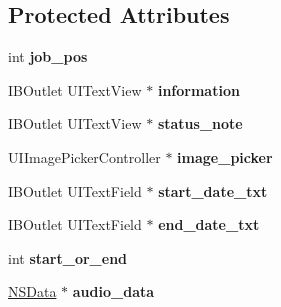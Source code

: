 \subsection*{\-Protected \-Attributes}
\begin{DoxyCompactItemize}
\item 
\hypertarget{interface_check_out_entry_aeee2de59ad12dcf4e823726ac5afe302}{
int {\bfseries job\-\_\-pos}}
\label{interface_check_out_entry_aeee2de59ad12dcf4e823726ac5afe302}

\item 
\hypertarget{interface_check_out_entry_aea12e8d2a44a930ae75b22875d503d58}{
\-I\-B\-Outlet \-U\-I\-Text\-View $\ast$ {\bfseries information}}
\label{interface_check_out_entry_aea12e8d2a44a930ae75b22875d503d58}

\item 
\hypertarget{interface_check_out_entry_af48347effc2517db69384aef1ffc4990}{
\-I\-B\-Outlet \-U\-I\-Text\-View $\ast$ {\bfseries status\-\_\-note}}
\label{interface_check_out_entry_af48347effc2517db69384aef1ffc4990}

\item 
\hypertarget{interface_check_out_entry_a738127b16e6dc738c69292398dcac04c}{
\-U\-I\-Image\-Picker\-Controller $\ast$ {\bfseries image\-\_\-picker}}
\label{interface_check_out_entry_a738127b16e6dc738c69292398dcac04c}

\item 
\hypertarget{interface_check_out_entry_a488bc135c242b5537eb14d663551dd18}{
\-I\-B\-Outlet \-U\-I\-Text\-Field $\ast$ {\bfseries start\-\_\-date\-\_\-txt}}
\label{interface_check_out_entry_a488bc135c242b5537eb14d663551dd18}

\item 
\hypertarget{interface_check_out_entry_a2e2985b3edfb171c429590858872aad5}{
\-I\-B\-Outlet \-U\-I\-Text\-Field $\ast$ {\bfseries end\-\_\-date\-\_\-txt}}
\label{interface_check_out_entry_a2e2985b3edfb171c429590858872aad5}

\item 
\hypertarget{interface_check_out_entry_a6f8e5085839439744bfb8f693cb14104}{
int {\bfseries start\-\_\-or\-\_\-end}}
\label{interface_check_out_entry_a6f8e5085839439744bfb8f693cb14104}

\item 
\hypertarget{interface_check_out_entry_a4271dc6fb86593a18129f60fe3de0fda}{
\hyperlink{class_n_s_data}{\-N\-S\-Data} $\ast$ {\bfseries audio\-\_\-data}}
\label{interface_check_out_entry_a4271dc6fb86593a18129f60fe3de0fda}


\end{DoxyCompactItemize}
